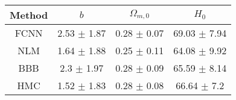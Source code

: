 \documentclass[convert={outext=.png}]{standalone}
\begin{document}
\centering
\label{tab:experimental_results}

\begin{tabular}{c c c c}

\hline
\hline
Method & $b$ & $\Omega_{m,0}$ & $H_0$ \\ \hline
 FCNN & 2.53 $\pm$ 1.87 & 0.28 $\pm$ 0.07 & 69.03 $\pm$ 7.94 \\
 NLM  & 1.64 $\pm$ 1.88 & 0.25 $\pm$ 0.11 & 64.08 $\pm$ 9.92 \\
 BBB  & 2.3 $\pm$ 1.97 & 0.28 $\pm$ 0.09 & 65.59 $\pm$ 8.14 \\
 HMC  & 1.52 $\pm$ 1.83 & 0.28 $\pm$ 0.08 & 66.64 $\pm$ 7.2 \\
\hline
\hline
\end{tabular}
\end{document}
